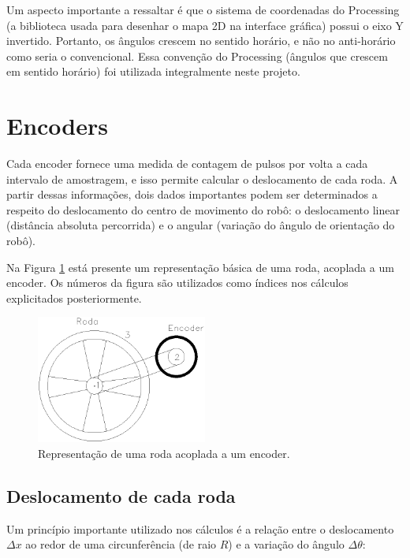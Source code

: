 Um aspecto importante a ressaltar é que o sistema de coordenadas do Processing (a biblioteca usada para desenhar o mapa 2D na interface gráfica) possui o eixo Y invertido. Portanto, os ângulos crescem no sentido horário, e não no anti-horário como seria o convencional. Essa convenção do Processing (ângulos que crescem em sentido horário) foi utilizada integralmente neste projeto.

\section{Encoders}

Cada encoder fornece uma medida de contagem de pulsos por volta a cada intervalo de amostragem, e isso permite calcular o deslocamento de cada roda. A partir dessas informações, dois dados importantes podem ser determinados a respeito do deslocamento do centro de movimento do robô: o deslocamento linear (distância absoluta percorrida) e o angular (variação do ângulo de orientação do robô).

Na Figura \ref{fig:roda_encoder} está presente um representação básica de uma roda, acoplada a um encoder. Os números da figura são utilizados como índices nos cálculos explicitados posteriormente.

\begin{figure}[H]
  \centering
  \includegraphics[width=0.5\textwidth, keepaspectratio]{./figuras/robo/roda_encoder.png}
  \caption{Representação de uma roda acoplada a um encoder.}
  \label{fig:roda_encoder}
\end{figure}

\subsection{Deslocamento de cada roda}

Um princípio importante utilizado nos cálculos é a relação entre o deslocamento $\Delta x$ ao redor de uma circunferência (de raio $R$) e a variação do ângulo $\Delta \theta$:

